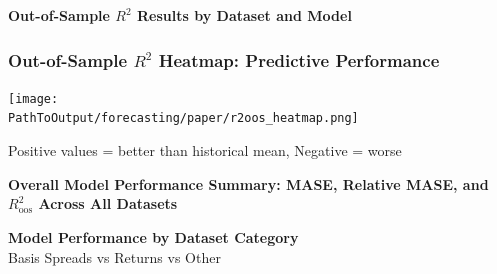 \documentclass[ignorenonframetext, 9pt]{beamer}
\begin{document}
\begin{frame}[plain]
    \tiny
    \vspace{-0.5cm}
    \centering
    \textbf{Out-of-Sample $R^2$ Results by Dataset and Model}\\
    \vspace{0.2cm}
    
\end{frame}

\begin{frame}
  \frametitle{Out-of-Sample $R^2$ Heatmap: Predictive Performance}
  \centering
  \texttt{[image: \\PathToOutput/forecasting/paper/r2oos\_heatmap.png]}
  \vspace{0.2cm}

  Positive values = better than historical mean, Negative = worse
\end{frame}

  \begin{frame}[plain]
    \tiny
    \vspace{-0.2cm}
    \centering
    \textbf{Overall Model Performance Summary: MASE, Relative MASE, and $R^2_{\text{oos}}$ Across All Datasets}\\
    \vspace{0.2cm}
    \resizebox{0.98\textwidth}{!}{}
  \end{frame}

  \begin{frame}[plain]
    \tiny
    \vspace{-0.2cm}
    \centering
    \textbf{Model Performance by Dataset Category}\\
    {\scriptsize Basis Spreads vs Returns vs Other}\\
    \vspace{0.2cm}
    \resizebox{0.98\textwidth}{!}{}
  \end{frame}
\end{document}
